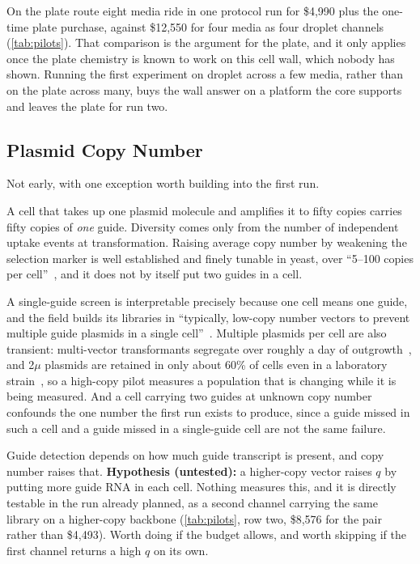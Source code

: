 On the plate route eight media ride in one protocol run for \$4{,}990 plus the
one-time plate purchase, against \$12{,}550 for four media as four droplet
channels (\cref{tab:pilots}). That comparison is the argument for the plate, and
it only applies once the plate chemistry is known to work on this cell wall,
which nobody has shown. Running the  first experiment on
droplet across a few media, rather than on the plate across many, buys the wall
answer on a platform the core supports and leaves the plate for run two.

\subsection{Plasmid Copy Number}
\label{sec:copy}

Not early, with one exception worth building into the first run.

 A
cell that takes up one plasmid molecule and amplifies it to fifty copies carries
fifty copies of \emph{one} guide. Diversity comes only from the number of
independent uptake events at transformation. Raising average copy number by
weakening the selection marker is well established and finely tunable in yeast,
over ``5--100 copies per
cell''~\citep{lianConstructionPlasmidsTunable2016}, and it does not by itself
put two guides in a cell.

 A single-guide screen is
interpretable precisely because one cell means one guide, and the field builds
its libraries in ``typically, low-copy number vectors to prevent multiple guide
plasmids in a single
cell''~\citep{robertsonAdvancesCRISPRenabledGenomewide2025}. Multiple plasmids
per cell are also transient: multi-vector transformants segregate over roughly a
day of outgrowth~\citep{scanlonQuantifyingResolvingMultiple2009}, and 2$\mu$
plasmids are retained in only about 60\% of cells even in a laboratory
strain~\citep{haysNaturalVariantEssential2020}, so a high-copy pilot measures a
population that is changing while it is being measured. And a cell carrying two
guides at unknown copy number confounds the one number the first run exists to
produce, since a guide missed in such a cell and a guide missed in a
single-guide cell are not the same failure.

 Guide detection depends on how
much guide transcript is present, and copy number raises that.
\textbf{Hypothesis (untested):} a higher-copy vector raises $q$ by putting more
guide RNA in each cell. Nothing measures this, and it is directly testable in
the run already planned, as a second channel carrying the same library on a
higher-copy backbone (\cref{tab:pilots}, row two, \$8{,}576 for the pair rather
than \$4{,}493). Worth doing if the budget allows, and worth skipping if the
first channel returns a high $q$ on its own.

